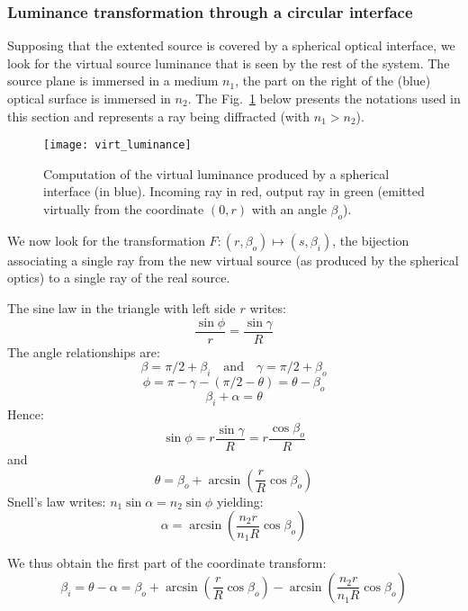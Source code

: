 \subsubsection*{Luminance transformation through a circular interface}
Supposing that the extented source is covered by a spherical optical interface,
we look for the virtual source luminance that is seen by the rest of the 
system. The source plane is immersed in a medium $n_1$, the part on the right
of the (blue) optical surface is immersed in $n_2$.
The Fig.~\ref{fig:virt_lum} below presents the notations used in this section and
represents a ray being diffracted (with $n_1 > n_2$).

\begin{figure}[!htbp]
\centering
\texttt{[image: virt\_luminance]} 
\caption{Computation of the virtual luminance produced by a spherical interface (in blue).
Incoming ray in red, output ray in green (emitted virtually from the coordinate $(0, r)$
with an angle $\beta_o$).}
\label{fig:virt_lum}
\end{figure}

We now look for the transformation $F: (r, \beta_o) \mapsto (s, \beta_i)$, the bijection
associating a single ray from the new virtual source (as produced by the spherical optics)
 to a single ray of the real source.

The sine law in the triangle with left side $r$ writes:
\[ \frac{\sin\phi}{r} = \frac{\sin\gamma}{R}\]
The angle relationships are:
\[ \beta = \pi/2+\beta_i  \quad\textrm{and}\quad  \gamma = \pi/2 + \beta_o\]
\[ \phi = \pi - \gamma - (\pi/2 -\theta) = \theta - \beta_o \]
\[\beta_i + \alpha = \theta \]
Hence:
\[ \sin\phi = r\frac{\sin\gamma}{R} = r \frac{\cos\beta_o}{R} \]
and
\begin{equation}  
 \theta = \beta_o + \arcsin\left( \frac{r}{R}\cos\beta_o\right)
 \label{eq:lum_theta}
\end{equation}
Snell's law writes: $n_1 \sin\alpha = n_2\sin\phi$ yielding:
\begin{equation}  
\alpha = \arcsin\left( \frac{n_2 r}{n_1 R}\cos\beta_o \right)
 \label{eq:lum_alpha}
\end{equation}

We thus obtain the first part of the coordinate transform:
\begin{equation}
\beta_i = \theta-\alpha = \beta_o + \arcsin\left( \frac{r}{R}\cos\beta_o\right)
                         - \arcsin\left( \frac{n_2 r}{n_1 R}\cos\beta_o \right)
\label{eq:lum_betai}
\end{equation}

